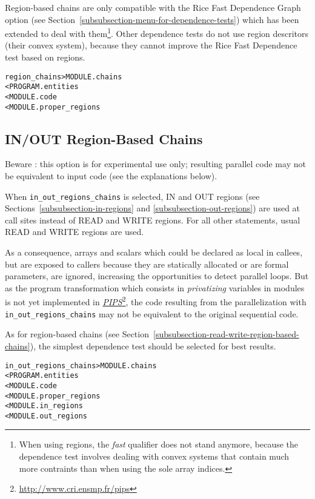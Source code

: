 \documentclass[a4paper]{report}
\newenvironment{PipsMake}{\begin{alltt}}{\end{alltt}}
\newcommand{\LINK}[2]{\href{#2}{#1}\footnote{\url{#2}}\xspace}
\newcommand{\PIPS}{\LINK{\emph{PIPS}}{http://www.cri.ensmp.fr/pips}}
\begin{document}
Region-based chains are only compatible with the Rice Fast Dependence Graph
option (see Section~\ref{subsubsection-menu-for-dependence-tests})
which has been extended to deal with them\footnote{When using regions,
the {\em fast} qualifier does not stand anymore, because the dependence
test involves dealing with convex systems that contain much more
contraints than when using the sole array indices.}.  Other
dependence tests do not use region descritors (their convex system),
because they cannot improve the Rice Fast Dependence test based on regions. 
 

\begin{PipsMake}
region_chains                   > MODULE.chains
        < PROGRAM.entities
        < MODULE.code
        < MODULE.proper_regions
\end{PipsMake}

\subsection{IN/OUT Region-Based Chains}

\label{subsubsection-in-out-region-based-chains}

Beware : this option is for experimental use only; resulting parallel code
may not be equivalent to input code (see the explanations below).

When \verb+in_out_regions_chains+ is selected, IN and OUT regions (see
Sections~\ref{subsubsection-in-regions} and
\ref{subsubsection-out-regions}) are used at call sites instead of
READ and WRITE regions. For all other statements, usual READ and WRITE
regions are used. 

As a consequence, arrays and scalars which could be declared as
local in callees, but are exposed to callers because they are
statically allocated or are formal parameters, are ignored, increasing
the opportunities to detect parallel loops. But as the program
transformation which consists in {\em privatizing} variables in
modules is not yet implemented in \PIPS{}, the code resulting from the
parallelization with \verb+in_out_regions_chains+ may not be
equivalent to the original sequential code. 

As for region-based chains (see
Section~\ref{subsubsection-read-write-region-based-chains}), the
simplest dependence test should be selected for best results.

\begin{PipsMake}
in_out_regions_chains           > MODULE.chains
        < PROGRAM.entities
        < MODULE.code
        < MODULE.proper_regions
        < MODULE.in_regions
        < MODULE.out_regions
\end{PipsMake}
\end{document}
